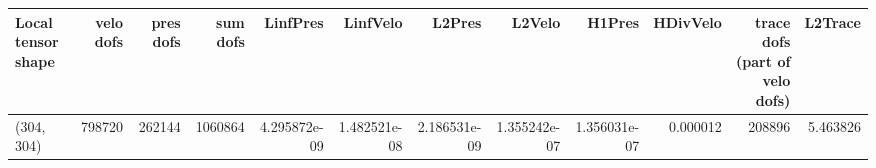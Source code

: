 \begin{tabular}{lrrrrrrrrrrr}
\toprule
Local tensor shape &  velo dofs &  pres dofs &  sum dofs &     LinfPres &     LinfVelo &       L2Pres &       L2Velo &       H1Pres &  HDivVelo &  trace dofs (part of velo dofs) &  L2Trace \\
\midrule
        (304, 304) &     798720 &     262144 &   1060864 & 4.295872e-09 & 1.482521e-08 & 2.186531e-09 & 1.355242e-07 & 1.356031e-07 &  0.000012 &                          208896 & 5.463826 \\
\bottomrule
\end{tabular}
